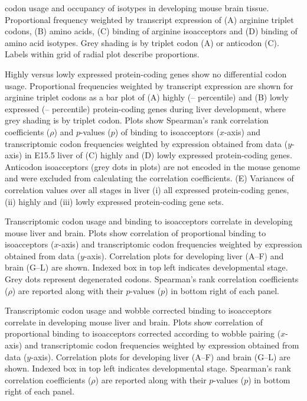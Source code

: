     {\mrna codon usage and  occupancy of \trna isotypes in developing mouse
    brain tissue.}
    {Proportional frequency weighted by transcript expression of (A) arginine
    triplet codons, (B) amino acids, (C)  binding of arginine isoacceptors
    and (D)  binding of amino acid isotypes. Grey shading is by triplet
    codon (A) or \trna anticodon (C). Labels within grid of radial plot describe
    proportions.}

    {Highly versus lowly expressed protein-coding genes show no differential
    codon usage.}
    {Proportional frequencies weighted by transcript expression are shown for
    arginine triplet codons as a bar plot of (A) highly (–
    percentile) and (B) lowly expressed (– percentile)
    protein-coding genes during liver development, where grey shading is by
    triplet codon. Plots show Spearman’s rank correlation coefficients
    (\(\rho\)) and \(p\)-values (\(p\)) of  binding to \trna isoacceptors
    (\(x\)-axis) and transcriptomic codon frequencies weighted by expression
    obtained from \rnaseq data (\(y\)-axis) in E15.5 liver of (C) highly and (D)
    lowly expressed protein-coding genes. Anticodon isoacceptors (grey dots in
    plots) are not encoded in the mouse genome and were excluded from
    calculating the correlation coefficients. (E) Variances of correlation
    values over all stages in liver (i) all expressed protein-coding genes, (ii)
    highly and (iii) lowly expressed protein-coding gene sets.}

    {Transcriptomic \mrna codon usage and  binding to \trna isoacceptors
    correlate in developing mouse liver and brain.}
    {Plots show correlation of proportional  binding to \trna isoacceptors
    (\(x\)-axis) and transcriptomic codon frequencies weighted by expression
    obtained from \rnaseq data (\(y\)-axis). Correlation plots for developing
    liver (A–F) and brain (G–L) are shown. Indexed box in top left indicates
    developmental stage. Grey dots represent degenerated codons. Spearman’s rank
    correlation coefficients (\(\rho\)) are reported along with their \(p\)-values
    (\(p\)) in bottom right of each panel.}

\thispagestyle{empty}
    {Transcriptomic \mrna codon usage and wobble corrected  binding to
    \trna isoacceptors correlate in developing mouse liver and brain.}
    {Plots show correlation of proportional  binding to \trna isoacceptors
    corrected according to wobble pairing (\(x\)-axis) and transcriptomic codon
    frequencies weighted by expression obtained from \rnaseq data (\(y\)-axis).
    Correlation plots for developing liver (A–F) and brain (G–L) are shown.
    Indexed box in top left indicates developmental stage. Spearman’s rank
    correlation coefficients (\(\rho\)) are reported along with their
    \(p\)-values (\(p\)) in bottom right of each panel.}

